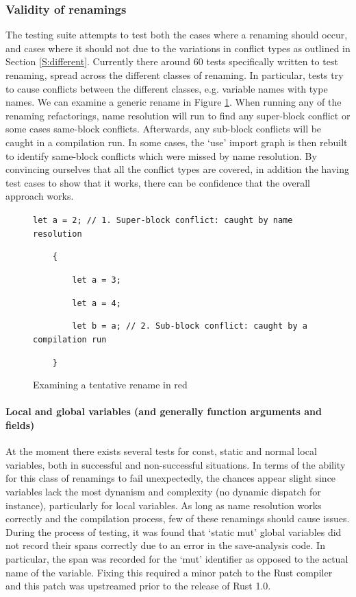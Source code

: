 \subsubsection{Validity of renamings}
The testing suite attempts to test both the cases where a renaming should occur, and cases where it should not due to the variations in conflict types as outlined in Section \ref{S:different}. Currently there around 60 tests specifically written to test renaming, spread across the different classes of renaming. In particular, tests try to cause conflicts between the different classes, e.g. variable names with type names. We can examine a generic rename in Figure \ref{Fig:walk}. When running any of the renaming refactorings, name resolution will run to find any super-block conflict or some cases same-block conflicts. Afterwards, any sub-block conflicts will be caught in a compilation run. In some cases, the `use' import graph is then rebuilt to identify same-block conflicts which were missed by name resolution. By convincing ourselves that all the conflict types are covered, in addition the having test cases to show that it works, there can be confidence that the overall approach works.

\begin{figure}
{\verb|let a = 2; // 1. Super-block conflict: caught by name resolution|}

{\verb|    {|}

{\verb|        let |}{\color{red}\verb|a|}{\verb| = 3;|}

{\verb|        let a = 4;|}

{\verb|        let b = |}{\color{red}\verb|a|}{\verb|; // 2. Sub-block conflict: caught by a compilation run|}

{\verb|    }|}
\caption{Examining a tentative rename in red}
\label{Fig:walk}
\end{figure}

\paragraph{Local and global variables (and generally function arguments and fields)}
At the moment there exists several tests for const, static and normal local variables, both in successful and non-successful situations. In terms of the ability for this class of renamings to fail unexpectedly, the chances appear slight since variables lack the most dynanism and complexity (no dynamic dispatch for instance), particularly for local variables. As long as name resolution works correctly and the compilation process, few of these renamings should cause issues. During the process of testing, it was found that `static mut' global variables did not record their spans correctly due to an error in the save-analysis code. In particular, the span was recorded for the `mut' identifier as opposed to the actual name of the variable. Fixing this required a minor patch to the Rust compiler and this patch was upstreamed prior to the release of Rust 1.0.

